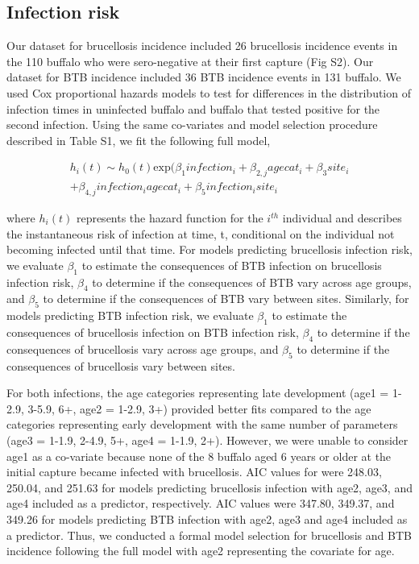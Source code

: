 \documentclass[11pt]{article}
\begin{document}
\pagebreak

\subsection*{Infection risk}
Our dataset for brucellosis incidence included 26 brucellosis incidence events in the 110 buffalo who were sero-negative at their first capture (Fig S2). Our dataset for BTB incidence included 36 BTB incidence events in 131 buffalo. We used Cox proportional hazards models to test for differences in the distribution of infection times in uninfected buffalo and buffalo that tested positive for the second infection. Using the same co-variates and model selection procedure described in Table S1, we fit the following full model,

\begin{gather*}
h_{i}(t) \sim h_{0}(t) \text{exp} (\beta_{1} infection_i + \beta_{2,j} agecat_i + \beta_3 site_i \\
+ \beta_{4,j} infection_i agecat_i + \beta_{5} infection_i site_i 
\end{gather*}

where $h_{i}(t)$ represents the hazard function for the $i^{th}$ individual and describes the instantaneous risk of infection at time, t, conditional on the individual not becoming infected until that time. For models predicting brucellosis infection risk, we evaluate $\beta_1$ to estimate the consequences of BTB infection on brucellosis infection risk, $\beta_4$ to determine if the consequences of BTB vary across age groups, and $\beta_5$ to determine if the consequences of BTB vary between sites. Similarly, for models predicting BTB infection risk, we evaluate $\beta_1$ to estimate the consequences of brucellosis infection on BTB infection risk, $\beta_4$ to determine if the consequences of brucellosis vary across age groups, and $\beta_5$ to determine if the consequences of brucellosis vary between sites.

For both infections, the age categories representing late development (age1 = 1-2.9, 3-5.9, 6+, age2 = 1-2.9, 3+) provided better fits compared to the age categories representing early development with the same number of parameters (age3 = 1-1.9, 2-4.9, 5+, age4 = 1-1.9, 2+). However, we were unable to consider age1 as a co-variate because none of the 8 buffalo aged 6 years or older at the initial capture became infected with brucellosis.  AIC values for were 248.03, 250.04, and 251.63 for models predicting brucellosis infection with age2, age3, and age4 included as a predictor, respectively. AIC values were 347.80, 349.37, and 349.26 for models predicting BTB infection with age2, age3 and age4 included as a predictor. Thus, we conducted a formal model selection for brucellosis and BTB incidence following the full model with age2 representing the covariate for age. 
\end{document}
